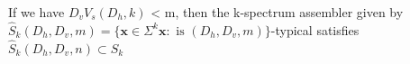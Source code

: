 \documentclass[preview]{standalone}
\begin{document}
\begin{center}
If we have ${D}_v{V}_s({D}_h, k)$ < m, then the k-spectrum assembler given by $\hat{S}_k({D}_h, {D}_v, m) = \{\textbf{x} \in \Sigma^k \textbf{x}: \text{ is }({D}_h, {D}_v, m)\}$-typical satisfies $\hat{S}_k({D}_h, {D}_v, n) \subset {S}_k$
\end{center}
\end{document}
